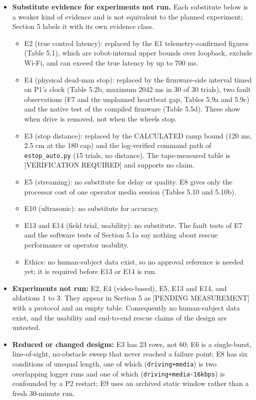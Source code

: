 \begin{itemize}
\item \textbf{Substitute evidence for experiments not run.} Each substitute below is a weaker kind of evidence and is not equivalent to the planned experiment; Section 5 labels it with its own evidence class.
  \begin{itemize}
  \item E2 (true control latency): replaced by the E1 telemetry-confirmed figures (Table 5.1), which are robot-internal upper bounds over loopback, exclude Wi-Fi, and can exceed the true latency by up to 700 ms.
  \item E4 (physical dead-man stop): replaced by the firmware-side interval timed on P1's clock (Table 5.2b, maximum 2042 ms in 30 of 30 trials), two fault observations (F7 and the unplanned heartbeat gap, Tables 5.9a and 5.9c) and the native test of the compiled firmware (Table 5.5d). These show when drive is removed, not when the wheels stop.
  \item E3 (stop distance): replaced by the CALCULATED ramp bound (120 ms, 2.5 cm at the 180 cap) and the log-verified command path of \texttt{estop\_auto.py} (15 trials, no distance). The tape-measured table is [VERIFICATION REQUIRED] and supports no claim.
  \item E5 (streaming): no substitute for delay or quality. E8 gives only the processor cost of one operator media session (Tables 5.10 and 5.10b).
  \item E10 (ultrasonic): no substitute for accuracy.
  \item E13 and E14 (field trial, usability): no substitute. The fault tests of E7 and the software tests of Section 5.1a say nothing about rescue performance or operator usability.
  \item Ethics: no human-subject data exist, so no approval reference is needed yet; it is required before E13 or E14 is run.
  \end{itemize}
\item \textbf{Experiments not run:} E2, E4 (video-based), E5, E13 and E14, and ablations 1 to 3. They appear in Section 5 as [PENDING MEASUREMENT] with a protocol and an empty table. Consequently no human-subject data exist, and the usability and end-to-end rescue claims of the design are untested.
\item \textbf{Reduced or changed designs:} E3 has 23 rows, not 60; E6 is a single-burst, line-of-sight, no-obstacle sweep that never reached a failure point; E8 has six conditions of unequal length, one of which (\texttt{driving+media}) is two overlapping logger runs and one of which (\texttt{driving+media-16kbps}) is confounded by a P2 restart; E9 uses an archived static window rather than a fresh 30-minute run.

\end{itemize}
